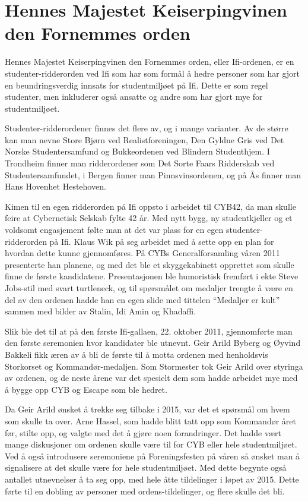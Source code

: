 \chapter[Ifi-ordenen]{Hennes Majestet Keiserpingvinen den Fornemmes orden}

\author{Skrevet av Arne Hassel}

Hennes Majestet Keiserpingvinen den Fornemmes orden, eller Ifi-ordenen, er en studenter-ridderorden ved Ifi som har som formål å hedre personer som har gjort en beundringsverdig innsats for studentmiljøet på Ifi. Dette er som regel studenter, men inkluderer også ansatte og andre som har gjort mye for studentmiljøet.

Studenter-ridderordener finnes det flere av, og i mange varianter. Av de større kan man nevne Store Bjørn ved Realistforeningen, Den Gyldne Gris ved Det Norske Studentersamfund og Bukkeordenen ved Blindern Studenthjem. I Trondheim finner man ridderordener som Det Sorte Faars Ridderskab ved Studentersamfundet, i Bergen finner man Pinnsvinsordenen, og på Ås finner man Hans Hovenhet Hestehoven.

Kimen til en egen ridderorden på Ifi oppsto i arbeidet til CYB42, da man skulle feire at Cybernetisk Selskab fylte 42 år. Med nytt bygg, ny studentkjeller og et voldsomt engasjement følte man at det var plass for en egen studenter-ridderorden på Ifi. Klaus Wik på seg arbeidet med å sette opp en plan for hvordan dette kunne gjennomføres. På CYBs Generalforsamling våren 2011 presenterte han planene, og med det ble et skyggekabinett opprettet som skulle finne de første kandidatene. Presentasjonen ble humoristisk fremført i ekte Steve Jobs-stil med svart turtleneck, og til spørsmålet om medaljer trengte å være en del av den ordenen hadde han en egen slide med tittelen ``Medaljer er kult'' sammen med bilder av Stalin, Idi Amin og Khadaffi.

Slik ble det til at på den første Ifi-gallaen, 22. oktober 2011, gjennomførte man den første seremonien hvor kandidater ble utnevnt. Geir Arild Byberg og Øyvind Bakkeli fikk æren av å bli de første til å motta ordenen med henholdsvis Storkorset og Kommandør-medaljen. Som Stormester tok Geir Arild over styringa av ordenen, og de neste årene var det spesielt dem som hadde arbeidet mye med å bygge opp CYB og Escape som ble hedret.

Da Geir Arild ønsket å trekke seg tilbake i 2015, var det et spørsmål om hvem som skulle ta over. Arne Hassel, som hadde blitt tatt opp som Kommandør året før, stilte opp, og valgte med det å gjøre noen forandringer. Det hadde vært mange diskusjoner om ordenen skulle være til for CYB eller hele studentmiljøet. Ved å også introdusere seremoniene på Foreningsfesten på våren så ønsket man å signalisere at det skulle være for hele studentmiljøet. Med dette begynte også antallet utnevnelser å ta seg opp, med hele åtte tildelinger i løpet av 2015. Dette førte til en dobling av personer med ordens-tildelinger, og flere skulle det bli.

